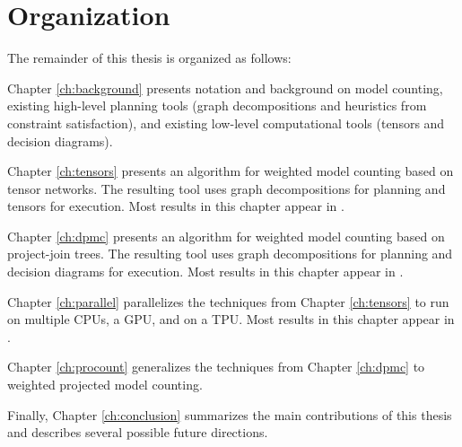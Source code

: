 \section{Organization}
The remainder of this thesis is organized as follows:

Chapter \ref{ch:background} presents notation and background on model counting, existing high-level planning tools (graph decompositions and heuristics from constraint satisfaction), and existing low-level computational tools (tensors and decision diagrams). 

Chapter \ref{ch:tensors} presents an algorithm for weighted model counting based on tensor networks. The resulting tool  uses graph decompositions for planning and tensors for execution. Most results in this chapter appear in \cite{DDV19}.

Chapter \ref{ch:dpmc} presents an algorithm for weighted model counting based on project-join trees. The resulting tool  uses graph decompositions for planning and decision diagrams for execution. Most results in this chapter appear in \cite{dudek2020dpmc}.

Chapter \ref{ch:parallel} parallelizes the techniques from Chapter \ref{ch:tensors} to run on multiple CPUs, a GPU, and on a TPU. Most results in this chapter appear in \cite{dudek2020parallel}.

Chapter \ref{ch:procount} generalizes the techniques from Chapter \ref{ch:dpmc} to weighted projected model counting.

Finally, Chapter \ref{ch:conclusion} summarizes the main contributions of this thesis and describes several possible future directions.